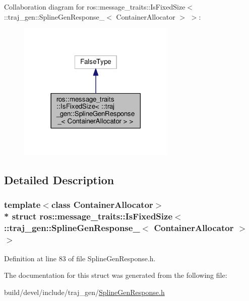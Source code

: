 Collaboration diagram for ros\+:\+:message\+\_\+traits\+:\+:Is\+Fixed\+Size$<$ \+:\+:traj\+\_\+gen\+:\+:Spline\+Gen\+Response\+\_\+$<$ Container\+Allocator $>$ $>$\+:
\nopagebreak
\begin{figure}[H]
\begin{center}
\leavevmode
\includegraphics[width=213pt]{structros_1_1message__traits_1_1_is_fixed_size_3_01_1_1traj__gen_1_1_spline_gen_response___3_01_541b5f3e958d29158a93d0c7c8bdbc12}
\end{center}
\end{figure}


\subsection{Detailed Description}
\subsubsection*{template$<$class Container\+Allocator$>$\\*
struct ros\+::message\+\_\+traits\+::\+Is\+Fixed\+Size$<$ \+::traj\+\_\+gen\+::\+Spline\+Gen\+Response\+\_\+$<$ Container\+Allocator $>$ $>$}



Definition at line 83 of file Spline\+Gen\+Response.\+h.



The documentation for this struct was generated from the following file\+:\begin{DoxyCompactItemize}
\item 
build/devel/include/traj\+\_\+gen/\hyperlink{_spline_gen_response_8h}{Spline\+Gen\+Response.\+h}\end{DoxyCompactItemize}
